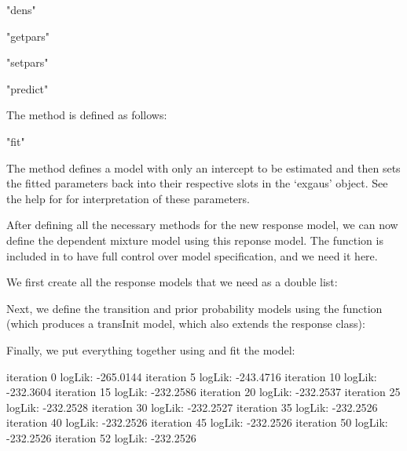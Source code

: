 \documentclass[article]{jss}
\begin{document}
\begin{Schunk}
\begin{Soutput}
[1] "dens"
\end{Soutput}
\begin{Soutput}
[1] "getpars"
\end{Soutput}
\begin{Soutput}
[1] "setpars"
\end{Soutput}
\begin{Soutput}
[1] "predict"
\end{Soutput}
\end{Schunk}


The  method is defined as follows: 
\begin{Schunk}
\begin{Soutput}
[1] "fit"
\end{Soutput}
\end{Schunk}

The  method defines a  model with 
only an intercept to be estimated and then sets the fitted parameters 
back into their respective slots in the `exgaus' object. See the help 
for  for interpretation of these parameters. 

After defining all the necessary methods for the new response model, 
we can  now define the dependent mixture model using this reponse model. 
The function  is included in  to have 
full control over model specification, and we need it here. 

We first create all the response models that we need as a double list: 

Next, we define the transition and prior probability models using the 
 function (which produces a transInit model, which also extends 
the response class): 

Finally, we put everything together using  and fit 
the model: 
\begin{Schunk}
\begin{Soutput}
iteration 0 logLik: -265.0144 
iteration 5 logLik: -243.4716 
iteration 10 logLik: -232.3604 
iteration 15 logLik: -232.2586 
iteration 20 logLik: -232.2537 
iteration 25 logLik: -232.2528 
iteration 30 logLik: -232.2527 
iteration 35 logLik: -232.2526 
iteration 40 logLik: -232.2526 
iteration 45 logLik: -232.2526 
iteration 50 logLik: -232.2526 
iteration 52 logLik: -232.2526 
\end{Soutput}
\end{Schunk}
\end{document}
